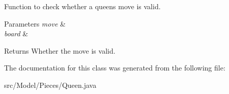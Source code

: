 Function to check whether a queen\textquotesingle{}s move is valid. 
\begin{DoxyParams}{Parameters}
{\em move} & \\
\hline
{\em board} & \\
\hline
\end{DoxyParams}
\begin{DoxyReturn}{Returns}
Whether the move is valid. 
\end{DoxyReturn}


The documentation for this class was generated from the following file\+:\begin{DoxyCompactItemize}
\item 
src/\+Model/\+Pieces/Queen.\+java\end{DoxyCompactItemize}
